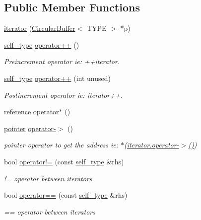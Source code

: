 \subsection*{Public Member Functions}
\begin{DoxyCompactItemize}
\item 
\hyperlink{classCircularBuffer_1_1iterator_afdaf10c8cd54b3f2b6fd14c8b370b8a9}{iterator} (\hyperlink{classCircularBuffer}{Circular\+Buffer}$<$ T\+Y\+PE $>$ $\ast$p)
\item 
\hyperlink{classCircularBuffer_1_1iterator_a7dae9b5926088a3ef46a8a654e383605}{self\+\_\+type} \hyperlink{classCircularBuffer_1_1iterator_aa0a5aeca1ded37429c21b93c00efdc73}{operator++} ()
\begin{DoxyCompactList}\small\item\em Preincrement operator ie\+: ++iterator. \end{DoxyCompactList}\item 
\hyperlink{classCircularBuffer_1_1iterator_a7dae9b5926088a3ef46a8a654e383605}{self\+\_\+type} \hyperlink{classCircularBuffer_1_1iterator_af45f4d81bc792dd3633b1a262cb07dde}{operator++} (int unused)
\begin{DoxyCompactList}\small\item\em Postincrement operator ie\+: iterator++. \end{DoxyCompactList}\item 
\hyperlink{classCircularBuffer_1_1iterator_a9aa4665328da6f468a188ae36c6b00a3}{reference} \hyperlink{classCircularBuffer_1_1iterator_a0b2329fce9fb1311a154902fe1f9f3b7}{operator$\ast$} ()
\item 
\hyperlink{classCircularBuffer_1_1iterator_a35ab71bca3df750e955de46c222b8ee3}{pointer} \hyperlink{classCircularBuffer_1_1iterator_a158958ab9785710e115f626c8344f51d}{operator-\/$>$} ()
\begin{DoxyCompactList}\small\item\em pointer operator to get the address ie\+: $\ast$(\hyperlink{classCircularBuffer_1_1iterator_a158958ab9785710e115f626c8344f51d}{iterator.\+operator-\/$>$()}) \end{DoxyCompactList}\item 
bool \hyperlink{classCircularBuffer_1_1iterator_af5604b0c13183772cd70fec67cc19374}{operator!=} (const \hyperlink{classCircularBuffer_1_1iterator_a7dae9b5926088a3ef46a8a654e383605}{self\+\_\+type} \&rhs)
\begin{DoxyCompactList}\small\item\em != operator between iterators \end{DoxyCompactList}\item 
bool \hyperlink{classCircularBuffer_1_1iterator_aa8d9ce991d27c8b258199594f31109b1}{operator==} (const \hyperlink{classCircularBuffer_1_1iterator_a7dae9b5926088a3ef46a8a654e383605}{self\+\_\+type} \&rhs)
\begin{DoxyCompactList}\small\item\em == operator between iterators \end{DoxyCompactList}\end{DoxyCompactItemize}


